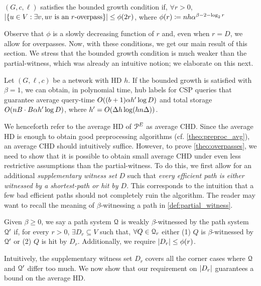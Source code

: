 \begin{definition}
$(G,c,\ell)$ satisfies the bounded growth condition if, $\forall r>0$, $\lvert\{u\in V: \exists v, uv \text{ is an $r$-overpass}\}\rvert\leq \phi(2r)$, where $\phi(r)\coloneqq nh\alpha^{\beta-2-\log_2r}$
\end{definition}

Observe that $\phi$ is a slowly decreasing function of $r$ and, even when $r=D$, we allow for overpasses.
Now, with these conditions, we get our main result of this section.
We stress that the bounded growth condition is much weaker than the partial-witness, which was already an intuitive notion; we elaborate on this next.

\begin{theorem}\label{theo:overpasses}
Let $(G,\ell,c)$ be a network with HD $h$.
If the bounded growth is satisfied with $\beta=1$, we can obtain, in polynomial time, hub labels for CSP queries that guarantee average query-time $O((b+1)\alpha h'\log D)$ and total storage $O(nB\cdot B\alpha h'\log D)$, where $h'=O(\Delta h\log(hn\Delta))$.
\end{theorem}

We henceforth refer to the average HD of $\mathcal{P}^E$ as average CHD.
Since the average HD is enough to obtain good preprocessing algorithms (cf. \cref{theo:preproc_avg}), an average CHD should intuitively suffice.
However, to prove \cref{theo:overpasses}, we need to show that it is possible to obtain small average CHD under even less restrictive assumptions than the partial-witness.
To do this, we first allow for an additional \emph{supplementary witness set} $D$ such that \emph{every efficient path is either witnessed by a shortest-path or hit by $D$}.
This corresponds to the intuition that a few bad efficient paths should not completely ruin the algorithm. 
The reader may want to recall the meaning of $\beta$-witnessing a path in \cref{def:partial_witness}.

\begin{definition}
Given $\beta\geq 0$, we say a path system  $\mathcal{Q}$ is weakly $\beta$-witnessed by the path system $\mathcal{Q}'$ if, for every $r>0$, $\exists D_r\subseteq V$ such that, $\forall Q\in \mathcal{Q}_r$ either (1) $Q$ is $\beta$-witnessed by $\mathcal{Q}'$ or (2) $Q$ is hit by $D_r$.
Additionally, we require $\lvert D_r\rvert\leq \phi(r)$.
\end{definition} 

Intuitively, the supplementary witness set $D_r$ covers all the corner cases where $\mathcal{Q}$ and $\mathcal{Q}'$ differ too much.
We now show that our requirement on $\lvert D_r\rvert$ guarantees a bound on the average HD.

